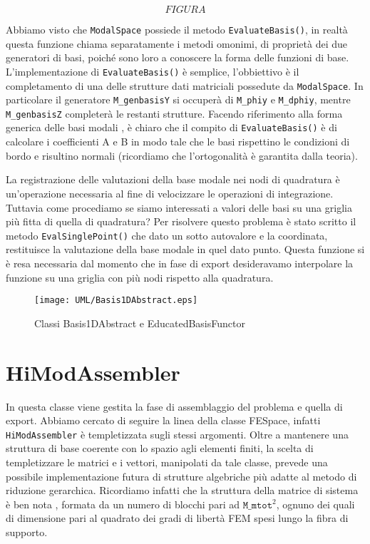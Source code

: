 \begin{equation}
FIGURA
\end{equation}

Abbiamo visto che \texttt{ModalSpace} possiede il metodo \texttt{EvaluateBasis()}, in realt\`a questa funzione chiama separatamente i metodi omonimi, di propriet\`a dei due generatori di basi, poich\'e sono loro a conoscere la forma delle funzioni di base. L'implementazione di \texttt{EvaluateBasis()} \`e semplice, l'obbiettivo \`e il completamento di una delle strutture dati matriciali possedute da \texttt{ModalSpace}. In particolare il generatore \texttt{M\_genbasisY} si occuper\`a di \texttt{M\_phiy} e \texttt{M\_dphiy}, mentre \texttt{M\_genbasisZ} completer\`a le restanti strutture.
Facendo riferimento alla forma generica delle basi modali , \`e chiaro che il compito di \texttt{EvaluateBasis()} \`e di calcolare i coefficienti A e B in modo tale che le basi rispettino le condizioni di bordo e risultino normali (ricordiamo che l'ortogonalit\`a \`e garantita dalla teoria).

La registrazione delle valutazioni della base modale nei nodi di quadratura \`e un'operazione necessaria al fine di velocizzare le operazioni di integrazione. Tuttavia come procediamo se siamo interessati a valori delle basi su una griglia pi\`u fitta di quella di quadratura? Per risolvere questo problema \`e stato scritto il metodo \texttt{EvalSinglePoint()} che dato un sotto autovalore e la coordinata, restituisce la valutazione della base modale in quel dato punto. Questa funzione si \`e resa necessaria dal momento che in fase di export desideravamo interpolare la funzione su una griglia con pi\`u nodi rispetto alla quadratura.

\begin{figure}[!htbp]
        \centering%
          {\label{fig: slice9}\texttt{[image: UML/Basis1DAbstract.eps]}}\qquad
        \caption{Classi Basis1DAbstract e EducatedBasisFunctor}
        \label{fig: UMLBasis}
\end{figure}

\section{HiModAssembler}
 
 In questa classe viene gestita la fase di assemblaggio del problema e quella di export. Abbiamo cercato di seguire la linea della classe FESpace, infatti \texttt{HiModAssembler} \`e templetizzata sugli stessi argomenti. Oltre a mantenere una struttura di base coerente con lo spazio agli elementi finiti, la scelta di templetizzare le matrici e i vettori, manipolati da tale classe, prevede una possibile implementazione futura di strutture algebriche pi\`u adatte al metodo di riduzione gerarchica. Ricordiamo infatti che la struttura della matrice di sistema \`e ben nota  , formata da un numero di blocchi pari ad $\texttt{M\_mtot}^2$, ognuno dei quali di dimensione pari al quadrato dei gradi di libert\`a FEM spesi lungo la fibra di supporto.
 


